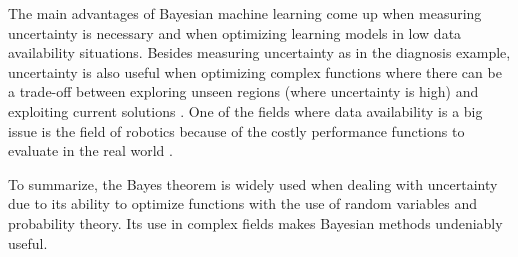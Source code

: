 The main advantages of Bayesian machine learning come up when measuring uncertainty is necessary and when optimizing learning models in low data availability situations. Besides measuring uncertainty as in the diagnosis example, uncertainty is also useful when optimizing complex functions where there can be a trade-off between exploring unseen regions (where uncertainty is high) and exploiting current solutions \parencite{Luke2013Metaheuristics}. One of the fields where data availability is a big issue is the field of robotics because of the costly performance functions to evaluate in the real world \parencite{shahriari2015taking}. 

To summarize, the Bayes theorem is widely used when dealing with uncertainty due to its ability to optimize functions with the use of random variables and probability theory. Its use in complex fields makes Bayesian methods undeniably useful.

\printbibliography


